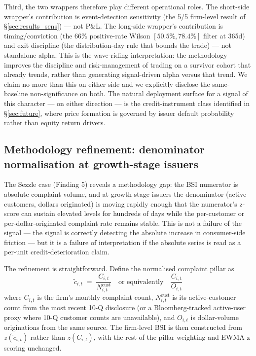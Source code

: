 \documentclass[11pt,a4paper]{article}
\begin{document}
Third, the two wrappers therefore play different operational roles. The short-side wrapper's contribution is event-detection sensitivity (the 5/5 firm-level result of §\ref{sec:results_sens}) --- not P\&L. The long-side wrapper's contribution is timing/conviction (the 66\% positive-rate Wilson $[50.5\%, 78.4\%]$ filter at 365d) and exit discipline (the distribution-day rule that bounds the trade) --- not standalone alpha. This is the wave-riding interpretation: the methodology improves the discipline and risk-management of trading on a survivor cohort that already trends, rather than generating signal-driven alpha versus that trend. We claim no more than this on either side and we explicitly disclose the same-baseline non-significance on both. The natural deployment surface for a signal of this character --- on either direction --- is the credit-instrument class identified in §\ref{sec:future}, where price formation is governed by issuer default probability rather than equity return drivers.

\subsection{Methodology refinement: denominator normalisation at growth-stage issuers}\label{sec:denominator}

The Sezzle case (Finding 5) reveals a methodology gap: the BSI numerator is absolute complaint volume, and at growth-stage issuers the denominator (active customers, dollars originated) is moving rapidly enough that the numerator's z-score can sustain elevated levels for hundreds of days while the per-customer or per-dollar-originated complaint rate remains stable. This is not a failure of the signal --- the signal is correctly detecting the absolute increase in consumer-side friction --- but it is a failure of interpretation if the absolute series is read as a per-unit credit-deterioration claim.

The refinement is straightforward. Define the normalised complaint pillar as
\[
\widetilde{c}_{i,t} \;=\; \frac{C_{i,t}}{N_{i,t}^{\text{cust}}} \quad\text{or equivalently}\quad \frac{C_{i,t}}{O_{i,t}}
\]
where $C_{i,t}$ is the firm's monthly complaint count, $N_{i,t}^{\text{cust}}$ is its active-customer count from the most recent 10-Q disclosure (or a Bloomberg-tracked active-user proxy where 10-Q customer counts are unavailable), and $O_{i,t}$ is dollar-volume originations from the same source. The firm-level BSI is then constructed from $z(\widetilde{c}_{i,t})$ rather than $z(C_{i,t})$, with the rest of the pillar weighting and EWMA z-scoring unchanged.
\end{document}
